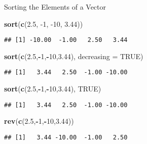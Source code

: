\documentclass[ignorenonframetext,]{beamer}
\newenvironment{Shaded}{\begin{snugshade}}{\end{snugshade}}
\newcommand{\DataTypeTok}[1]{\textcolor[rgb]{0.13,0.29,0.53}{#1}}
\newcommand{\DecValTok}[1]{\textcolor[rgb]{0.00,0.00,0.81}{#1}}
\newcommand{\FloatTok}[1]{\textcolor[rgb]{0.00,0.00,0.81}{#1}}
\newcommand{\KeywordTok}[1]{\textcolor[rgb]{0.13,0.29,0.53}{\textbf{#1}}}
\newcommand{\NormalTok}[1]{#1}
\newcommand{\OperatorTok}[1]{\textcolor[rgb]{0.81,0.36,0.00}{\textbf{#1}}}
\newcommand{\OtherTok}[1]{\textcolor[rgb]{0.56,0.35,0.01}{#1}}
\begin{document}
\begin{frame}[fragile]{Sorting the Elements of a Vector}
\protect\hypertarget{sorting-the-elements-of-a-vector-1}{}

\begin{Shaded}
\begin{Highlighting}[]
\KeywordTok{sort}\NormalTok{(}\KeywordTok{c}\NormalTok{(}\FloatTok{2.5}\NormalTok{, }\DecValTok{-1}\NormalTok{, }\DecValTok{-10}\NormalTok{, }\FloatTok{3.44}\NormalTok{))}
\end{Highlighting}
\end{Shaded}

\begin{verbatim}
## [1] -10.00  -1.00   2.50   3.44
\end{verbatim}

\begin{Shaded}
\begin{Highlighting}[]
\KeywordTok{sort}\NormalTok{(}\KeywordTok{c}\NormalTok{(}\FloatTok{2.5}\NormalTok{,}\OperatorTok{-}\DecValTok{1}\NormalTok{,}\OperatorTok{-}\DecValTok{10}\NormalTok{,}\FloatTok{3.44}\NormalTok{), }\DataTypeTok{decreasing =} \OtherTok{TRUE}\NormalTok{)}
\end{Highlighting}
\end{Shaded}

\begin{verbatim}
## [1]   3.44   2.50  -1.00 -10.00
\end{verbatim}

\begin{Shaded}
\begin{Highlighting}[]
\KeywordTok{sort}\NormalTok{(}\KeywordTok{c}\NormalTok{(}\FloatTok{2.5}\NormalTok{,}\OperatorTok{-}\DecValTok{1}\NormalTok{,}\OperatorTok{-}\DecValTok{10}\NormalTok{,}\FloatTok{3.44}\NormalTok{), }\OtherTok{TRUE}\NormalTok{)}
\end{Highlighting}
\end{Shaded}

\begin{verbatim}
## [1]   3.44   2.50  -1.00 -10.00
\end{verbatim}

\begin{Shaded}
\begin{Highlighting}[]
\KeywordTok{rev}\NormalTok{(}\KeywordTok{c}\NormalTok{(}\FloatTok{2.5}\NormalTok{,}\OperatorTok{-}\DecValTok{1}\NormalTok{,}\OperatorTok{-}\DecValTok{10}\NormalTok{,}\FloatTok{3.44}\NormalTok{))}
\end{Highlighting}
\end{Shaded}

\begin{verbatim}
## [1]   3.44 -10.00  -1.00   2.50
\end{verbatim}

\end{frame}
\end{document}

